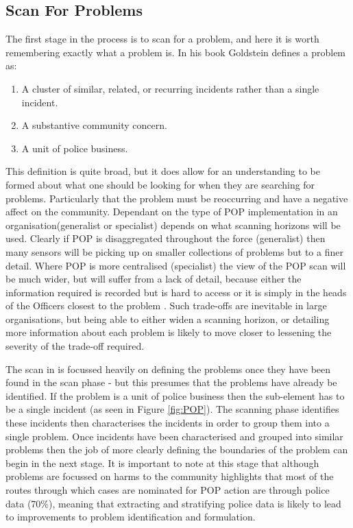 \subsection{Scan For Problems} The first stage in the process is to scan for a problem, and here it is worth remembering exactly what a problem is. In his book \textcite{goldstein1990}  Goldstein defines a problem as:

\begin{enumerate}

\item A cluster of similar, related, or recurring incidents rather than a single incident.
\item A substantive community concern.
\item A unit of police business.

\end{enumerate}


This definition is quite broad, but it does allow for an understanding to be formed about what one should be looking for when they are searching for problems. Particularly that the problem must be reoccurring and have a negative affect on the community. Dependant on the type of POP implementation in an organisation(generalist or specialist) depends on what scanning horizons will be used. Clearly if POP is disaggregated throughout the force (generalist) then many sensors will be picking up on smaller collections of problems but to a finer detail. Where POP is more centralised (specialist) the view of the POP scan will be much wider, but will suffer from a lack of detail, because either the information required is recorded but is hard to access or it is simply in the heads of the Officers closest to the problem \parencite{goldstein1990}. Such trade-offs are inevitable in large organisations, but being able to either widen a scanning horizon, or detailing more information about each problem is likely to move closer to lessening the severity of the trade-off required.

The scan in  is focussed heavily on defining the problems once they have been found in the scan phase - but this presumes that the problems have already be identified. If the problem is a unit of police business then the sub-element has to be a single incident (as seen in Figure \ref{fig:POP}). The scanning phase identifies these incidents then characterises the incidents in order to group them into a single problem. Once incidents have been characterised and grouped into similar problems then the job of more clearly defining the boundaries of the problem can begin in the next stage. It is important to note at this stage that although problems are focussed on harms to the community \textcite{maguire2015problem} highlights that most of the routes through which cases are nominated for POP action are through police data (70\%), meaning that extracting and stratifying police data is likely to lead to improvements to problem identification and formulation.

